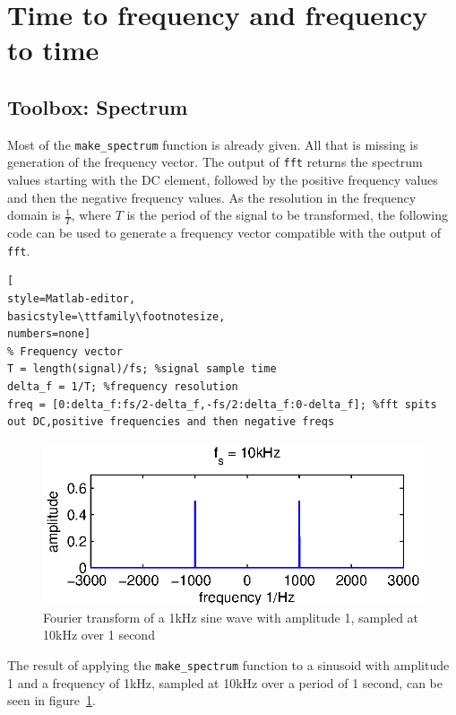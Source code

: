 \section{Time to frequency and frequency to time}
\subsection{Toolbox: Spectrum}
Most of the \texttt{make\_spectrum} function is already given. All that is missing is generation of the frequency vector.
The output of \texttt{fft} returns the spectrum values starting with the DC element, followed by the positive frequency values
and then the negative frequency values. As the resolution in the frequency domain is \(\frac{1}{T}\), where \(T\) is the period of 
the signal to be transformed, the following code can be used to generate a frequency vector compatible with the output of \texttt{fft}.

\begin{lstlisting}[
style=Matlab-editor,
basicstyle=\ttfamily\footnotesize,
numbers=none]
% Frequency vector
T = length(signal)/fs; %signal sample time
delta_f = 1/T; %frequency resolution
freq = [0:delta_f:fs/2-delta_f,-fs/2:delta_f:0-delta_f]; %fft spits out DC,positive frequencies and then negative freqs
\end{lstlisting}

\begin{figure}
	\center
	\includegraphics{./picture/3-1-1.eps}
	\caption{Fourier transform of a 1kHz sine wave with amplitude 1, sampled at 10kHz over 1 second}
	\label{fig:1.1}
\end{figure}

The result of applying the \texttt{make\_spectrum} function to a sinusoid with amplitude 1 and a frequency of 1kHz, sampled at 10kHz over
a period of 1 second, can be seen in figure~\ref{fig:1.1}.
